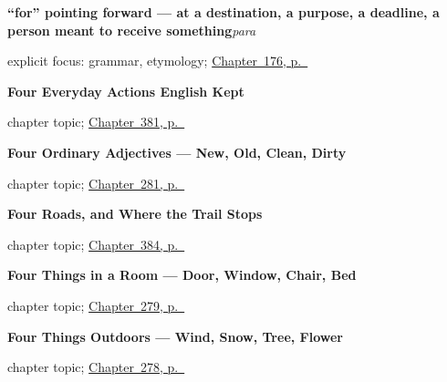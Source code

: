 \noindent\begin{minipage}[t]{\linewidth}
\raggedright
\textbf{\textquotedblleft{}for\textquotedblright{} pointing forward — at a destination, a purpose, a deadline, a person meant to receive something}\enspace\emph{para}\par
\footnotesize explicit focus: grammar, etymology; \hyperref[ch:para]{Chapter~176, p.~\pageref*{ch:para}}
\end{minipage}\par\smallskip

\noindent\begin{minipage}[t]{\linewidth}
\raggedright
\textbf{Four Everyday Actions English Kept}\par
\footnotesize chapter topic; \hyperref[ch:lavar-y-romper]{Chapter~381, p.~\pageref*{ch:lavar-y-romper}}
\end{minipage}\par\smallskip

\noindent\begin{minipage}[t]{\linewidth}
\raggedright
\textbf{Four Ordinary Adjectives --- New, Old, Clean, Dirty}\par
\footnotesize chapter topic; \hyperref[ch:cuatro-adjetivos]{Chapter~281, p.~\pageref*{ch:cuatro-adjetivos}}
\end{minipage}\par\smallskip

\noindent\begin{minipage}[t]{\linewidth}
\raggedright
\textbf{Four Roads, and Where the Trail Stops}\par
\footnotesize chapter topic; \hyperref[ch:enviar-y-subir]{Chapter~384, p.~\pageref*{ch:enviar-y-subir}}
\end{minipage}\par\smallskip

\noindent\begin{minipage}[t]{\linewidth}
\raggedright
\textbf{Four Things in a Room --- Door, Window, Chair, Bed}\par
\footnotesize chapter topic; \hyperref[ch:la-habitacion]{Chapter~279, p.~\pageref*{ch:la-habitacion}}
\end{minipage}\par\smallskip

\noindent\begin{minipage}[t]{\linewidth}
\raggedright
\textbf{Four Things Outdoors --- Wind, Snow, Tree, Flower}\par
\footnotesize chapter topic; \hyperref[ch:al-aire-libre]{Chapter~278, p.~\pageref*{ch:al-aire-libre}}
\end{minipage}\par\smallskip

